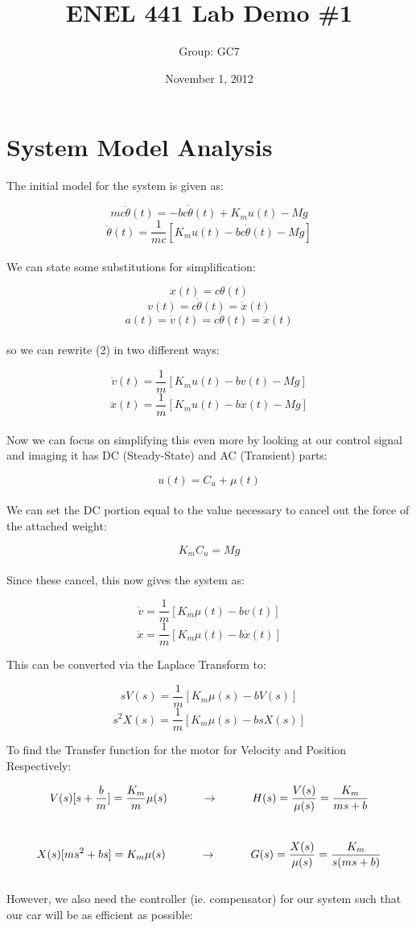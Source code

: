 \documentclass{article}
\title{\bf{ENEL 441 Lab Demo \#1}}
\author{Group: GC7}
\date{November 1, 2012}
\begin{document}
\pagestyle{empty}

\maketitle

\pagebreak


\section*{System Model Analysis}
{
\noindent The initial model for the system is given as:

\[ mc\ddot{\theta}(t) = -bc\dot{\theta}(t) + K_mu(t) - Mg \]
\[ \ddot{\theta}(t) = \frac{1}{mc}[K_mu(t) - bc\dot{\theta}(t) -Mg] \]
\\
We can state some substitutions for simplification:

\[ x(t) = c\theta(t) \]
\[ v(t) = c\dot\theta(t) = \dot x(t) \]
\[ a(t) = \dot v(t) = c\ddot\theta(t) = \ddot x(t) \]
\\
so we can rewrite (2) in two different ways:

\[ \dot v(t) = \frac{1}{m}[K_mu(t) - bv(t) - Mg] \]
\[ \ddot x(t) = \frac{1}{m}[K_mu(t) -b\dot x(t) - Mg] \]
\\
Now we can focus on simplifying this even more by looking at our control signal and imaging it has DC (Steady-State) and AC (Transient) parts:

\[ u(t) = C_u + \mu(t) \]
\\
We can set the DC portion equal to the value necessary to cancel out the force of the attached weight:

\[ K_mC_u = Mg \]
\\
Since these cancel, this now gives the system as:

\[ \dot v = \frac{1}{m}[K_m\mu(t) - bv(t)] \]
\[ \ddot x = \frac{1}{m}[K_m\mu(t) - b\dot x(t)] \]

This can be converted via the Laplace Transform to:

\[ sV(s) = \frac{1}{m}[K_m\mu(s) - bV(s)] \]
\[ s^2X(s) = \frac{1}{m}[K_m\mu(s) - bsX(s)] \]

To find the Transfer function for the motor for Velocity and Position Respectively:

\[ V(s)[s + \frac{b}{m}] = \frac{K_m}{m}\mu(s) 
\indent\indent\rightarrow\indent\indent
H(s) = \frac{V(s)}{\mu(s)} = \frac{K_m}{ms + b} \]
\\
\[ X(s)[ms^2 +bs] = K_m\mu(s)
\indent\indent\rightarrow\indent\indent
G(s) = \frac{X(s)}{\mu(s)} = \frac{K_m}{s(ms + b)} \]
\\
However, we also need the controller (ie. compensator) for our system such that our car will be as efficient as possible:

}
\end{document}
